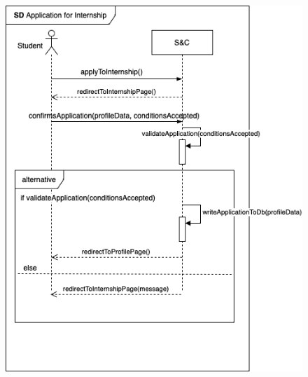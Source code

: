 \begin{enumerate}[label=\textbf{[US\arabic*]}, left = 0pt, align = left, resume]
            \newpage
            \begin{figure}[h!]
                \centering   \includegraphics{RASD/Images/UseCases/InternshipApplication.drawio.png}
                \label{fig: Application for Internship}
            \end{figure}

        \end{enumerate}

    \newpage
